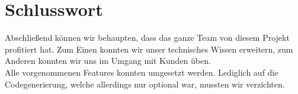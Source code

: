\section{Schlusswort}
Abschließend können wir behaupten, dass das ganze Team von diesem Projekt profitiert hat. Zum Einen konnten
wir unser technisches Wissen erweitern, zum Anderen konnten wir uns im Umgang mit Kunden üben.\\
Alle vorgenommenen Features konnten umgesetzt werden. Lediglich auf die Codegenerierung, welche allerdings
nur optional war, mussten wir verzichten.
